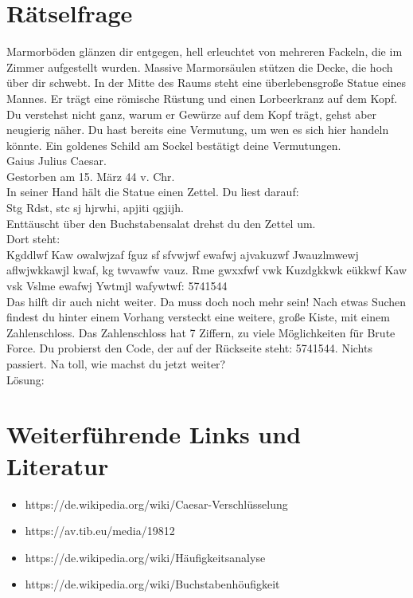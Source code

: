 \documentclass[12pt, letterpaper]{article}
\begin{document}
\section{Rätselfrage}

 Marmorböden glänzen dir entgegen, hell erleuchtet von mehreren Fackeln, die im Zimmer aufgestellt wurden.
 Massive Marmorsäulen stützen die Decke, die hoch über dir schwebt.
 In der Mitte des Raums steht eine überlebensgroße Statue eines Mannes.
 Er trägt eine römische Rüstung und einen Lorbeerkranz auf dem Kopf.
 Du verstehst nicht ganz, warum er Gewürze auf dem Kopf trägt, gehst aber neugierig näher.
 Du hast bereits eine Vermutung, um wen es sich hier handeln könnte.
 Ein goldenes Schild am Sockel bestätigt deine Vermutungen. \\

\noindent Gaius Julius Caesar. \\
Gestorben am 15. März 44 v. Chr. \\

\noindent In seiner Hand hält die Statue einen Zettel. Du liest darauf: \\

\noindent Stg Rdst, stc sj hjrwhi, apjiti qgjijh. \\

\noindent Enttäuscht über den Buchstabensalat drehst du den Zettel um. \\
Dort steht: \\

\noindent Kgddlwf Kaw owalwjzaf fguz sf sfvwjwf ewafwj ajvakuzwf Jwauzlmwewj aflwjwkkawjl kwaf, kg twvawfw vauz. Rme gwxxfwf vwk Kuzdgkkwk eükkwf Kaw vsk Vslme ewafwj Ywtmjl wafywtwf: 5741544 \\

\noindent Das hilft dir auch nicht weiter.
Da muss doch noch mehr sein!
Nach etwas Suchen findest du hinter einem Vorhang versteckt eine weitere, große Kiste, mit einem Zahlenschloss.
Das Zahlenschloss hat 7 Ziffern, zu viele Möglichkeiten für Brute Force.
Du probierst den Code, der auf der Rückseite steht: 5741544.
Nichts passiert.
Na toll, wie machst du jetzt weiter? \\

\noindent Lösung:

\section{Weiterführende Links und Literatur}

\begin{itemize}
	\item https://de.wikipedia.org/wiki/Caesar-Verschlüsselung
    \item https://av.tib.eu/media/19812
    \item https://de.wikipedia.org/wiki/Häufigkeitsanalyse
    \item https://de.wikipedia.org/wiki/Buchstabenhöufigkeit
\end{itemize}
\end{document}
